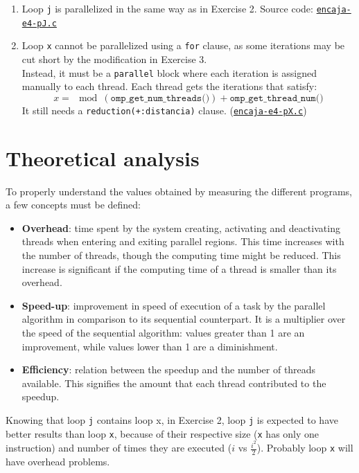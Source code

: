 \documentclass[a4paper]{article}
\newcommand{\github}{https://github.com/kauron/etsinf3/tree/master/CPA/lab2}
\newcommand{\gitline}[2]{\texttt{\href{\github /src/#1#2}{#1}}}
\begin{document}
\begin{enumerate}
\begin{enumerate}
        \item Loop \texttt{j} is parallelized in the same way as in Exercise 2. Source code: \gitline{encaja-e4-pJ.c}{\#L118}
        \item Loop \texttt{x} cannot be parallelized using a \texttt{for} clause, as some iterations may be cut short by the modification in Exercise 3.\\ Instead, it must be a \texttt{parallel} block where each iteration is assigned manually to each thread. Each thread gets the iterations that satisfy: $$x = \mod(\texttt{omp\_get\_num\_threads()}) + \texttt{omp\_get\_thread\_num()}$$ It still needs a \texttt{reduction(+:distancia)} clause. (\gitline{encaja-e4-pX.c}{\#L120})
    \end{enumerate}
\end{enumerate}

\section{Theoretical analysis}
\label{sec:theoretical}
To properly understand the values obtained by measuring the different programs, a few concepts must be defined:
\begin{itemize}
	\item \textbf{Overhead}: time spent by the system creating, activating and deactivating threads when entering and exiting parallel regions. This time increases with the number of threads, though the computing time might be reduced. This increase is significant if the computing time of a thread is smaller than its overhead.
	\item \textbf{Speed-up}: improvement in speed of execution of a task by the parallel algorithm in comparison to its sequential counterpart. It is a multiplier over the speed of the sequential algorithm: values greater than 1 are an improvement, while values lower than 1 are a diminishment.
	\item \textbf{Efficiency}: relation between the speedup and the number of threads available. This signifies the amount that each thread contributed to the speedup.
\end{itemize}

Knowing that loop \texttt{j} contains loop {x}, in Exercise 2, loop \texttt{j} is expected to have better results than loop \texttt{x}, because of their respective size (\texttt{x} has only one instruction) and number of times they are executed ($i$ vs $\frac{i^2}{2}$). Probably loop \texttt{x} will have overhead problems.
\end{document}
